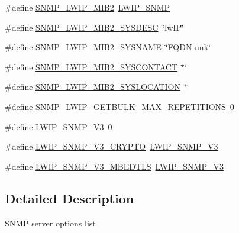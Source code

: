 \begin{DoxyCompactItemize}
\item 
\#define \hyperlink{group__snmp__opts_gaab667d48f48ee89f8bdbc7f134e6037d}{S\+N\+M\+P\+\_\+\+L\+W\+I\+P\+\_\+\+M\+I\+B2}~\hyperlink{group__snmp__opts_gaf4900859dc53f19f5f67cc34e48ad68c}{L\+W\+I\+P\+\_\+\+S\+N\+MP}
\item 
\#define \hyperlink{group__snmp__opts_gae93a105b421a2ca91e862da5087cec73}{S\+N\+M\+P\+\_\+\+L\+W\+I\+P\+\_\+\+M\+I\+B2\+\_\+\+S\+Y\+S\+D\+E\+SC}~\char`\"{}lw\+IP\char`\"{}
\item 
\#define \hyperlink{group__snmp__opts_ga80ba46f9517a51b5477f13082b2bcf98}{S\+N\+M\+P\+\_\+\+L\+W\+I\+P\+\_\+\+M\+I\+B2\+\_\+\+S\+Y\+S\+N\+A\+ME}~\char`\"{}F\+Q\+DN-\/unk\char`\"{}
\item 
\#define \hyperlink{group__snmp__opts_ga1a57501c615b630d363e0af1a504e683}{S\+N\+M\+P\+\_\+\+L\+W\+I\+P\+\_\+\+M\+I\+B2\+\_\+\+S\+Y\+S\+C\+O\+N\+T\+A\+CT}~\char`\"{}\char`\"{}
\item 
\#define \hyperlink{group__snmp__opts_ga311cec98c8f7e4851d325fffe96cf8d9}{S\+N\+M\+P\+\_\+\+L\+W\+I\+P\+\_\+\+M\+I\+B2\+\_\+\+S\+Y\+S\+L\+O\+C\+A\+T\+I\+ON}~\char`\"{}\char`\"{}
\item 
\#define \hyperlink{group__snmp__opts_ga5a24152aa5f3c2837b9a3145aa3c59f3}{S\+N\+M\+P\+\_\+\+L\+W\+I\+P\+\_\+\+G\+E\+T\+B\+U\+L\+K\+\_\+\+M\+A\+X\+\_\+\+R\+E\+P\+E\+T\+I\+T\+I\+O\+NS}~0
\item 
\#define \hyperlink{openmote-cc2538_2lwip_2src_2include_2lwip_2apps_2snmp__opts_8h_a1fe0e120f979ed400f649019edcefe2b}{L\+W\+I\+P\+\_\+\+S\+N\+M\+P\+\_\+\+V3}~0
\item 
\#define \hyperlink{openmote-cc2538_2lwip_2src_2include_2lwip_2apps_2snmp__opts_8h_a9023d215e3ae12386483f102f123d82a}{L\+W\+I\+P\+\_\+\+S\+N\+M\+P\+\_\+\+V3\+\_\+\+C\+R\+Y\+P\+TO}~\hyperlink{openmote-cc2538_2lwip_2src_2include_2lwip_2apps_2snmp__opts_8h_a1fe0e120f979ed400f649019edcefe2b}{L\+W\+I\+P\+\_\+\+S\+N\+M\+P\+\_\+\+V3}
\item 
\#define \hyperlink{openmote-cc2538_2lwip_2src_2include_2lwip_2apps_2snmp__opts_8h_aec8d46ed5bf44cac4c27ab77213e6949}{L\+W\+I\+P\+\_\+\+S\+N\+M\+P\+\_\+\+V3\+\_\+\+M\+B\+E\+D\+T\+LS}~\hyperlink{openmote-cc2538_2lwip_2src_2include_2lwip_2apps_2snmp__opts_8h_a1fe0e120f979ed400f649019edcefe2b}{L\+W\+I\+P\+\_\+\+S\+N\+M\+P\+\_\+\+V3}
\end{DoxyCompactItemize}


\subsection{Detailed Description}
S\+N\+MP server options list 

